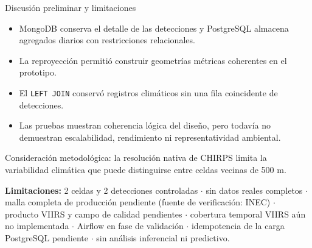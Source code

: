 \documentclass[aspectratio=169,11pt]{beamer}
\newcommand{\seccionactual}{Presentaci\'on}
\begin{document}
\renewcommand{\seccionactual}{IV. Discusi\'on preliminar}
\begin{frame}{Discusi\'on preliminar y limitaciones}
  \small
  \begin{itemize}\scriptsize
    \item MongoDB conserva el detalle de las detecciones y PostgreSQL almacena agregados diarios con restricciones relacionales.
    \item La reproyecci\'on permiti\'o construir geometr\'ias m\'etricas coherentes en el prototipo.
    \item El \texttt{LEFT JOIN} conserv\'o registros clim\'aticos sin una fila coincidente de detecciones.
    \item Las pruebas muestran coherencia l\'ogica del dise\~no, pero todav\'ia no demuestran escalabilidad, rendimiento ni representatividad ambiental.
  \end{itemize}
  \vspace{0.1cm}
  {\scriptsize\color{Tierra} Consideraci\'on metodol\'ogica: la resoluci\'on nativa de CHIRPS limita la variabilidad clim\'atica que puede distinguirse entre celdas vecinas de 500 m.}
  \vspace{0.15cm}
  \begin{center}
  \end{center}
  \vspace{0.15cm}
  {\scriptsize\textbf{Limitaciones:} 2 celdas y 2 detecciones controladas $\cdot$ sin datos reales completos $\cdot$ malla completa de producci\'on pendiente (fuente de verificaci\'on: INEC) $\cdot$ producto VIIRS y campo de calidad pendientes $\cdot$ cobertura temporal VIIRS a\'un no implementada $\cdot$ Airflow en fase de validaci\'on $\cdot$ idempotencia de la carga PostgreSQL pendiente $\cdot$ sin an\'alisis inferencial ni predictivo.}
\end{frame}
\end{document}
